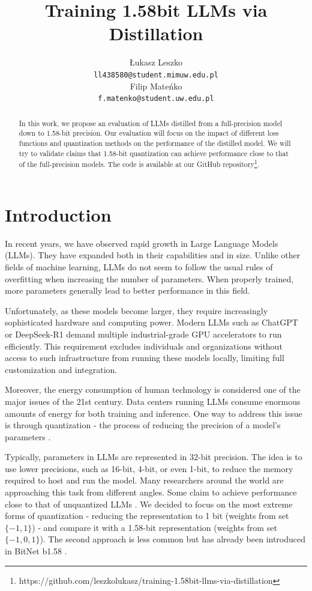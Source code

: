 \documentclass{article}
\title{Training 1.58bit LLMs via Distillation}
\author{Łukasz Leszko \\
	\texttt{ll438580@student.mimuw.edu.pl} \\
	\And
	Filip Mateńko \\
	\texttt{f.matenko@student.uw.edu.pl} \\
}
\begin{document}
\maketitle

\begin{abstract}
In this work, we propose an evaluation of LLMs distilled from a full-precision model down to 1.58-bit precision. Our evaluation will focus on the impact of different loss functions and quantization methods on the performance of the distilled model. We will try to validate claims that 1.58-bit quantization can achieve performance close to that of the full-precision models. The code is available at our GitHub repository\footnote{https://github.com/leszkolukasz/training-1.58bit-llms-via-distillation}. 
\end{abstract}




\section{Introduction}
In recent years, we have observed rapid growth in Large Language Models (LLMs). They have expanded both in their capabilities and in size. 
Unlike other fields of machine learning, LLMs do not seem to follow the usual rules of overfitting when increasing the number of 
parameters. When properly trained, more parameters generally lead to better performance in this field. 

Unfortunately, as these models become larger, they require increasingly sophisticated hardware and computing power. Modern LLMs such as 
ChatGPT or DeepSeek-R1 demand multiple industrial-grade GPU accelerators to run efficiently. This requirement excludes individuals and 
organizations without access to such infrastructure from running these models locally, limiting full customization and integration.

Moreover, the energy consumption of human technology is considered one of the major issues of the 21st century. Data centers running LLMs 
consume enormous amounts of energy for both training and inference. One way to address this issue is through quantization - the process of 
reducing the precision of a model's parameters \cite{quantizationtechniques}.

Typically, parameters in LLMs are represented in 32-bit precision. The idea is to use lower precisions, such as 16-bit, 4-bit, 
or even 1-bit, to reduce the memory required to host and run the model. Many researchers around the world are approaching this task from 
different angles. Some claim to achieve performance close to that of unquantized LLMs \cite{wang2023bitnetscaling1bittransformers}. We 
decided to focus on the most extreme forms of quantization - reducing the representation to 1 bit (weights from set \(\{-1,1\}\)) - and compare it
with a 1.58-bit representation (weights from set \(\{-1,0,1\}\)). The second approach is less common but has already been introduced in BitNet 
b1.58 \cite{ma2024era1bitllmslarge}.
\end{document}
